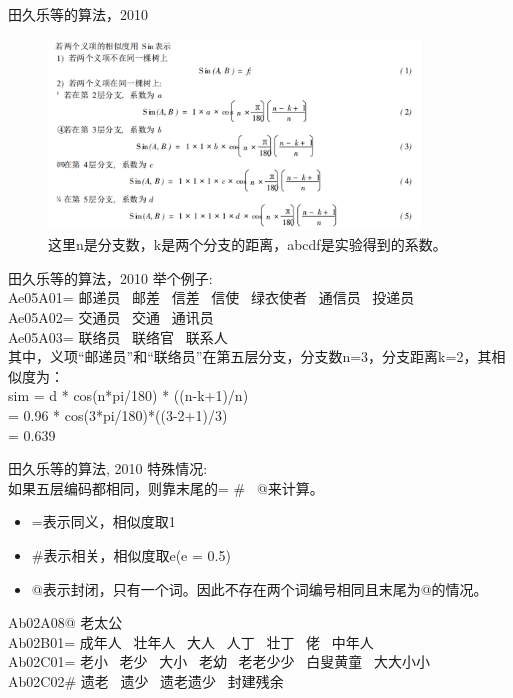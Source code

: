 \documentclass{beamer}
\begin{document}
    \begin{frame}{田久乐等的算法，2010}
    \begin{center}
      \begin{figure}
      \includegraphics[width=3.9in,height=2in]{cilin-method-2010.png}
      \caption{这里n是分支数，k是两个分支的距离，abcdf是实验得到的系数。}
      \end{figure}
      \end{center}
    \end{frame}

    \begin{frame}{田久乐等的算法，2010}
    举个例子: \\
    Ae05A01= 邮递员 \ 邮差 \ 信差 \ 信使 \ 绿衣使者 \ 通信员 \ 投递员 \\
    Ae05A02= 交通员 \ 交通 \ 通讯员 \\
    Ae05A03= 联络员 \ 联络官 \ 联系人 \\
    其中，义项“邮递员”和“联络员”在第五层分支，分支数n=3，分支距离k=2，其相似度为：\\
    sim = d * cos(n*pi/180) * ((n-k+1)/n) \\
        = 0.96 * cos(3*pi/180)*((3-2+1)/3) \\
        = 0.639 \\

    \end{frame}

    \begin{frame}{田久乐等的算法, 2010}
    特殊情况: \\
    如果五层编码都相同，则靠末尾的= \# \ @来计算。\\
    \begin{itemize}
      \item =表示同义，相似度取1 \\
      \item \#表示相关，相似度取e(e = 0.5) \\
      \item @表示封闭，只有一个词。因此不存在两个词编号相同且末尾为@的情况。\\
    \end{itemize}

    Ab02A08@ 老太公 \\
    Ab02B01= 成年人 \ 壮年人 \ 大人 \ 人丁 \ 壮丁 \ 佬 \ 中年人 \\
    Ab02C01= 老小 \ 老少 \ 大小 \ 老幼 \ 老老少少 \ 白叟黄童 \ 大大小小 \\
    Ab02C02\# 遗老 \ 遗少 \ 遗老遗少 \ 封建残余 \\
    \end{frame}
\end{document}
